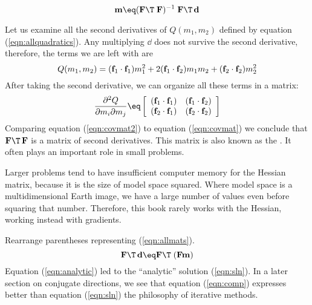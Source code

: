 \par
\begin{equation}
\bold m \eq
( \bold F\T \; \bold F )^{-1} \;
\bold F\T\,\dd 
\label{eqn:sln}
\end{equation}

\par
Let us examine all the second derivatives of $Q(m_1,m_2)$ defined by equation (\ref{eqn:allquadratics}).
Any multiplying $\dd$ does not survive the second derivative, therefore, the terms we are left with are
\begin{equation}
Q(m_1,m_2) = ({\bf f}_1\cdot{\bf f}_1) m_1^2 +
           2 ({\bf f}_1\cdot{\bf f}_2) m_1 m_2 +
             ({\bf f}_2\cdot{\bf f}_2) m_2^2
\end{equation}
After taking the second derivative, we can organize all these terms in a matrix:
\begin{equation}
\label{eqn:covmat2}
\frac{\partial^2 Q}{\partial m_i\partial m_j} \eq
        \left[
                \begin{array}{cc}
                        (\ff_1\cdot  \ff_1) &  (\ff_1 \cdot \ff_2)   \\
                        (\ff_2\cdot  \ff_1) &  (\ff_2 \cdot \ff_2)  
                \end{array}
        \right]
\end{equation}
Comparing equation (\ref{eqn:covmat2}) to equation (\ref{eqn:covmat}) we conclude
that $\bold F\T\,\bold F$ is a matrix of second derivatives.
This matrix is also known as the
.
It often plays an important role in small problems.

\par
Larger problems tend to have insufficient computer memory for the Hessian matrix,
because it is the size of model space squared.
Where model space is a multidimensional Earth image,
we have a large number of values even before squaring that number.
Therefore, this book rarely works with the Hessian,
working instead with gradients.
\par
Rearrange parentheses representing (\ref{eqn:allmats}).
\begin{equation}
\bold F\T\,\dd \eq  \bold F\T \; (\bold F   \bold m )
\label{eqn:comp}
\end{equation}
Equation
(\ref{eqn:analytic})
led to the ``analytic'' solution (\ref{eqn:sln}).
In a later section on conjugate directions,
we see that equation
(\ref{eqn:comp})
expresses better than
equation
(\ref{eqn:sln})
the philosophy of iterative methods.

